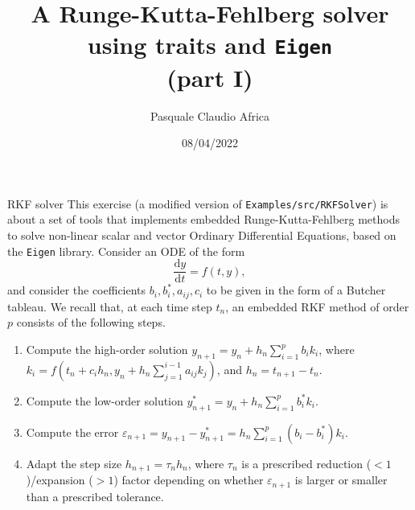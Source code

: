 \documentclass[10pt]{beamer}
\begin{document}
    \title{A Runge-Kutta-Fehlberg solver\protect\\using traits and \texttt{Eigen}\protect\\(part I)}
    \author{Pasquale Claudio Africa}
    \date{08/04/2022}

\begin{frame}
    \maketitle
\end{frame}

\begin{frame}{RKF solver}
This exercise (a modified version of \texttt{Examples/src/RKFSolver}) is about a set of tools that implements embedded Runge-Kutta-Fehlberg methods to solve non-linear scalar and vector Ordinary Differential Equations, based on the \texttt{Eigen} library.
\vfill
Consider an ODE of the form
\begin{equation*}
\frac{\mathrm{d} y}{\mathrm{d} t} = f(t, y),
\end{equation*}
and consider the coefficients \(b_i, b_i^*, a_{ij}, c_i\) to be given in the form of a Butcher tableau.
We recall that, at each time step \(t_n\), an embedded RKF method of order \(p\) consists of the following steps.
\begin{enumerate}
\item Compute the high-order solution \(y_{n+1} = y_{n} + h_n \sum_{i=1}^p b_i k_i\), where \(k_i = f\left(t_n + c_i h_n, y_n + h_n\sum_{j=1}^{i-1}a_{ij}k_j\right)\), and \(h_n = t_{n+1} - t_n\).
\item Compute the low-order solution \(y_{n+1}^* = y_{n} + h_n \sum_{i=1}^p b_i^* k_i\).
\item Compute the error \(\varepsilon_{n+1} = y_{n+1} - y_{n+1}^* = h_n \sum_{i=1}^p(b_i - b_i^*)k_i\).
\item Adapt the step size \(h_{n+1} = \tau_{n} h_{n}\), where \(\tau_{n}\) is a prescribed reduction (\(<1\))/expansion (\(>1\)) factor depending on whether \(\varepsilon_{n+1}\) is larger or smaller than a prescribed tolerance.
\end{enumerate}
\end{frame}
\end{document}
